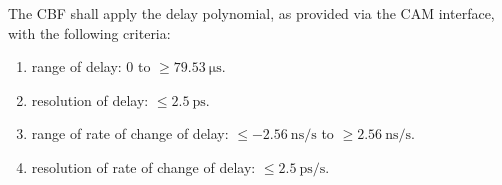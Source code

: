 The CBF shall apply the delay polynomial, as provided via the CAM
interface, with the following criteria:
\begin{enumerate}
\item range of delay: 0 to $\ge \SI{79.53}{\micro\second}$.
\item resolution of delay: $\le \SI{2.5}{\pico\second}$.
\item range of rate of change of delay:
$\le \SI{-2.56}{\nano\second\per\second}$ to
$\ge \SI{2.56}{\nano\second\per\second}$.
\item resolution of rate of change of delay:
$\le \SI{2.5}{\pico\second\per\second}$.
\end{enumerate}
